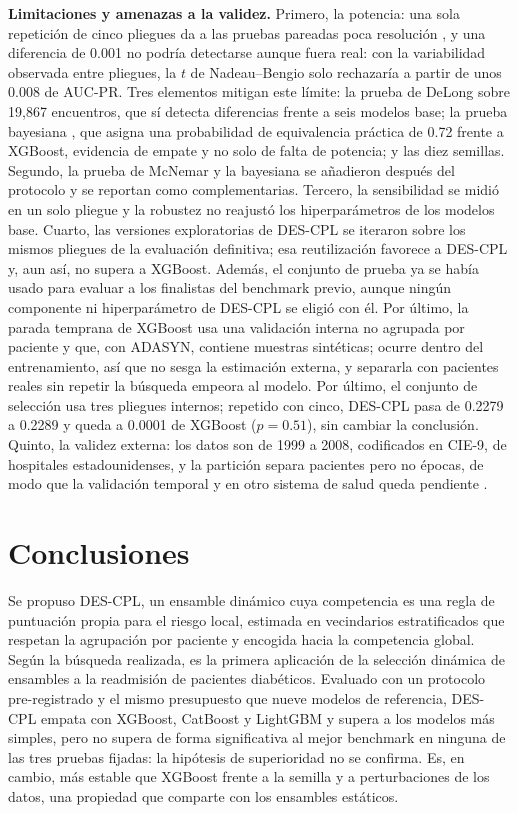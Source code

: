 \documentclass[pdflatex,sn-mathphys-num]{sn-jnl}
\theoremstyle{plain}
\begin{document}
\textbf{Limitaciones y amenazas a la validez.} Primero, la potencia: una sola repetición de cinco pliegues da a las pruebas pareadas poca resolución \cite{bib_nadeau_2003}, y una diferencia de 0.001 no podría detectarse aunque fuera real: con la variabilidad observada entre pliegues, la $t$ de Nadeau--Bengio solo rechazaría a partir de unos 0.008 de AUC-PR. Tres elementos mitigan este límite: la prueba de DeLong sobre 19{,}867 encuentros, que sí detecta diferencias frente a seis modelos base; la prueba bayesiana \cite{bib_benavoli_2017}, que asigna una probabilidad de equivalencia práctica de 0.72 frente a XGBoost, evidencia de empate y no solo de falta de potencia; y las diez semillas. Segundo, la prueba de McNemar y la bayesiana se añadieron después del protocolo y se reportan como complementarias. Tercero, la sensibilidad se midió en un solo pliegue y la robustez no reajustó los hiperparámetros de los modelos base. Cuarto, las versiones exploratorias de DES-CPL se iteraron sobre los mismos pliegues de la evaluación definitiva; esa reutilización favorece a DES-CPL y, aun así, no supera a XGBoost. Además, el conjunto de prueba ya se había usado para evaluar a los finalistas del benchmark previo, aunque ningún componente ni hiperparámetro de DES-CPL se eligió con él. Por último, la parada temprana de XGBoost usa una validación interna no agrupada por paciente y que, con ADASYN, contiene muestras sintéticas; ocurre dentro del entrenamiento, así que no sesga la estimación externa, y separarla con pacientes reales sin repetir la búsqueda empeora al modelo. Por último, el conjunto de selección usa tres pliegues internos; repetido con cinco, DES-CPL pasa de 0.2279 a 0.2289 y queda a 0.0001 de XGBoost ($p = 0.51$), sin cambiar la conclusión. Quinto, la validez externa: los datos son de 1999 a 2008, codificados en CIE-9, de hospitales estadounidenses, y la partición separa pacientes pero no épocas, de modo que la validación temporal y en otro sistema de salud queda pendiente \cite{bib_strack}.

\section{Conclusiones}\label{sec:conclusiones}

Se propuso DES-CPL, un ensamble dinámico cuya competencia es una regla de puntuación propia para el riesgo local, estimada en vecindarios estratificados que respetan la agrupación por paciente y encogida hacia la competencia global. Según la búsqueda realizada, es la primera aplicación de la selección dinámica de ensambles a la readmisión de pacientes diabéticos. Evaluado con un protocolo pre-registrado y el mismo presupuesto que nueve modelos de referencia, DES-CPL empata con XGBoost, CatBoost y LightGBM y supera a los modelos más simples, pero no supera de forma significativa al mejor benchmark en ninguna de las tres pruebas fijadas: la hipótesis de superioridad no se confirma. Es, en cambio, más estable que XGBoost frente a la semilla y a perturbaciones de los datos, una propiedad que comparte con los ensambles estáticos.
\end{document}
